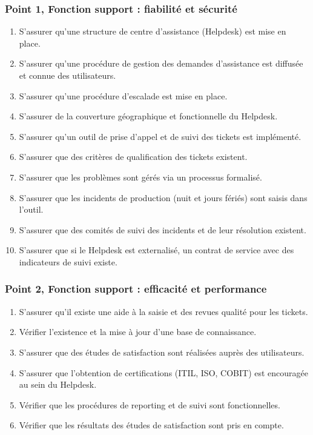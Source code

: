\subsubsection{Point 1, Fonction support : fiabilité et sécurité}
\begin{enumerate}[label=1.\arabic*.]
    \item S'assurer qu'une structure de centre d'assistance (Helpdesk) est mise en place.
    \item S'assurer qu'une procédure de gestion des demandes d'assistance est diffusée et connue des utilisateurs.
    \item S'assurer qu'une procédure d'escalade est mise en place.
    \item S'assurer de la couverture géographique et fonctionnelle du Helpdesk.
    \item S'assurer qu'un outil de prise d'appel et de suivi des tickets est implémenté.
    \item S'assurer que des critères de qualification des tickets existent.
    \item S'assurer que les problèmes sont gérés via un processus formalisé.
    \item S'assurer que les incidents de production (nuit et jours fériés) sont saisis dans l'outil.
    \item S'assurer que des comités de suivi des incidents et de leur résolution existent.
    \item S'assurer que si le Helpdesk est externalisé, un contrat de service avec des indicateurs de suivi existe.
\end{enumerate}

\subsubsection{Point 2, Fonction support : efficacité et performance}
\begin{enumerate}[label=2.\arabic*.]
    \item S'assurer qu'il existe une aide à la saisie et des revues qualité pour les tickets.
    \item Vérifier l'existence et la mise à jour d'une base de connaissance.
    \item S'assurer que des études de satisfaction sont réalisées auprès des utilisateurs.
    \item S'assurer que l'obtention de certifications (ITIL, ISO, COBIT) est encouragée au sein du Helpdesk.
    \item Vérifier que les procédures de reporting et de suivi sont fonctionnelles.
    \item Vérifier que les résultats des études de satisfaction sont pris en compte.
\end{enumerate}

